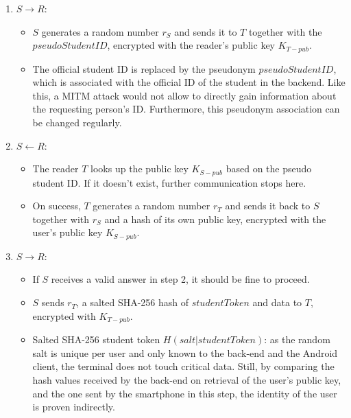 \begin{enumerate}
	\item $ S \rightarrow R $:
	\begin{itemize}
		\item $ S $ generates a random number $ r_S $ and sends it to $ T $ together with the $ pseudoStudentID $, encrypted with the reader's public key $ K_{T-pub} $.
		\item The official student ID is replaced by the pseudonym $ pseudoStudentID $, which is associated with the official ID of the student in the backend.
		Like this, a MITM attack would not allow to directly gain information about the requesting person's ID.
		Furthermore, this pseudonym association can be changed regularly.
	\end{itemize}	
	\item $ S \leftarrow R $:
	\begin{itemize}
		\item The reader $ T $ looks up the public key $ K_{S-pub} $ based on the pseudo student ID. If it doesn't exist, further communication stops here.
		\item On success, $ T $ generates a random number $ r_T $ and sends it back to $ S $ together with $ r_S $ and a hash of its own public key, encrypted with the user's public key $ K_{S-pub} $.
	\end{itemize}	
	\item $ S \rightarrow R $:
	\begin{itemize}
		\item If $ S $ receives a valid answer in step 2, it should be fine to proceed.
		\item $ S $ sends $ r_T $, a salted SHA-256 hash of $ studentToken $ and data to $ T $, encrypted with $ K_{T-pub} $.
		\item Salted SHA-256 student token $ H(salt|studentToken) $: as the random salt is unique per user and only known to the back-end and the Android client, the terminal does not touch critical data.
		Still, by comparing the hash values received by the back-end on retrieval of the user's public key, and the one sent by the smartphone in this step, the identity of the user is proven indirectly.
	\end{itemize}
\end{enumerate}

